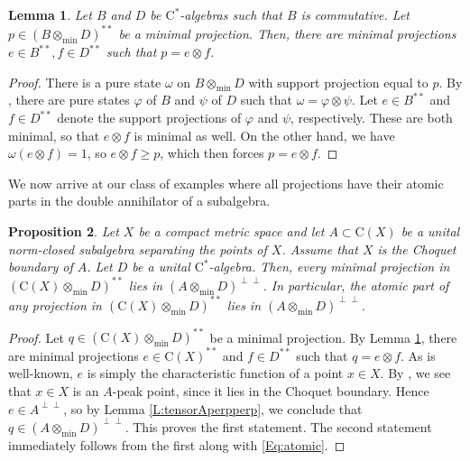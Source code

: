 \documentclass[10pt]{amsart}
\newcommand{\rC}{\mathrm{C}}
\renewcommand{\phi}{\varphi}
\newtheorem{lemma}{Lemma}[section]
\newtheorem{proposition}[lemma]{Proposition}
\theoremstyle{definition}
\begin{document}
\begin{lemma}\label{L:minprojtensor}
Let $B$ and $D$ be $\rC^*$-algebras such that $B$ is commutative. Let $p\in (B\otimes_{\min} D)^{**}$ be a minimal projection. Then, there are minimal projections $e\in B^{**},f\in D^{**}$ such that $p=e\otimes f$.
\end{lemma}
\begin{proof}
There is a pure state $\omega$ on $B\otimes_{\min}D$ with support projection equal to $p$. By \cite[Theorem IV.4.14]{takesaki2002}, there are pure states $\phi$ of $B$ and $\psi$ of $D$ such that $\omega=\phi\otimes \psi$. Let $e\in B^{**}$ and $f\in D^{**}$ denote the support projections of $\phi$ and $\psi$, respectively. These are both minimal, so that $e\otimes f$ is minimal as well. On the other hand, we have $\omega(e\otimes f)=1$, so $e\otimes f \geq p$, which then forces $p=e\otimes f$. 
\end{proof}

We now arrive at our class of examples where  all projections have their atomic parts in the double annihilator of a subalgebra.

\begin{proposition}\label{P:CXD}
Let $X$ be a compact metric space and let $A\subset \rC(X)$ be a unital norm-closed subalgebra separating the points of $X$. Assume that $X$ is the Choquet boundary of $A$. Let $D$ be a unital $\rC^*$-algebra. Then, every minimal projection in $(\rC(X)\otimes_{\min}D)^{**}$ lies in $(A\otimes_{\min}D)^{\perp\perp}$. In particular, the atomic part of any projection in $(\rC(X)\otimes_{\min}D)^{**}$ lies in $(A\otimes_{\min}D)^{\perp\perp}$.
\end{proposition}
\begin{proof}
Let $q\in (\rC(X)\otimes_{\min}D)^{**}$ be a minimal projection. By Lemma \ref{L:minprojtensor}, there are minimal projections $e\in \rC(X)^{**}$ and  $f\in D^{**}$ such that $q=e\otimes f$. 
As is well-known, $e$ is simply the characteristic function of a point $x\in X$. By \cite[Theorem II.11.3]{gamelin1969}, 
we see that $x\in X$ is an $A$-peak point, since it lies in the Choquet boundary.  Hence $e\in A^{\perp\perp}$, so by Lemma \ref{L:tensorAperpperp}, we conclude that 
$q \in (A\otimes_{\min}D)^{\perp\perp}$. This proves the first statement. The second statement immediately follows from the first along with \eqref{Eq:atomic}.
\end{proof}
\end{document}
